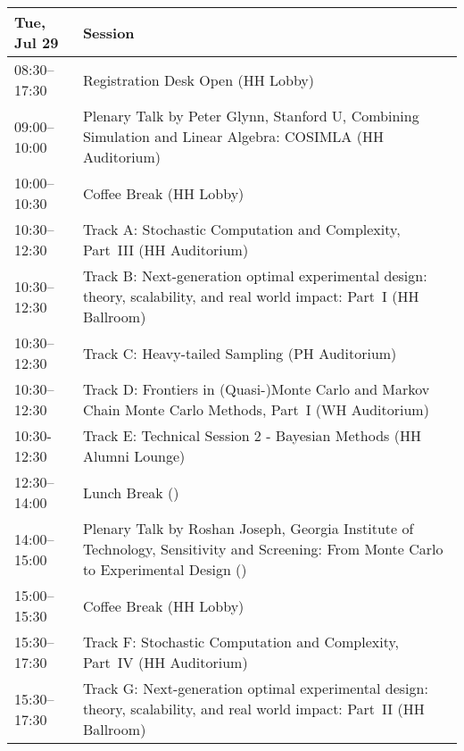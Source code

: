 \begin{table}
{\footnotesize
\begin{tabularx}{\textwidth}{>{\hsize=0.32\hsize}X|>{\hsize=1.7\hsize}X}
\hline
\textbf{Tue, Jul 29} & \textbf{Session} \\
\hline
\cellcolor{\EmptyColor}08:30–17:30 & \cellcolor{\EmptyColor}Registration Desk Open (HH Lobby) \\
\cellcolor{\PlenaryColor}09:00–10:00 & \cellcolor{\PlenaryColor}Plenary Talk by Peter Glynn, Stanford U, Combining Simulation and Linear Algebra: COSIMLA (HH Auditorium) \\
\cellcolor{\EmptyColor}10:00–10:30 & \cellcolor{\EmptyColor}Coffee Break (HH Lobby) \\
\cellcolor{\SessionTitleColor}10:30–12:30 & \cellcolor{\SessionTitleColor}Track A: Stochastic Computation and Complexity, Part~III (HH Auditorium) \\
\cellcolor{\SessionTitleColor}10:30–12:30 & \cellcolor{\SessionTitleColor}Track B: Next-generation optimal experimental design: theory, scalability, and real world impact: Part~I (HH Ballroom) \\
\cellcolor{\SessionTitleColor}10:30–12:30 & \cellcolor{\SessionTitleColor}Track C: Heavy-tailed Sampling (PH Auditorium) \\
\cellcolor{\SessionTitleColor}10:30–12:30 & \cellcolor{\SessionTitleColor}Track D: Frontiers in (Quasi-)Monte Carlo and Markov Chain Monte Carlo Methods, Part~I (WH Auditorium) \\
\cellcolor{\SessionLightColor}10:30-12:30 & \cellcolor{\SessionLightColor}Track E: Technical Session 2 - Bayesian Methods (HH Alumni Lounge) \\
\cellcolor{\EmptyColor}12:30–14:00 & \cellcolor{\EmptyColor}Lunch Break () \\
\cellcolor{\PlenaryColor}14:00–15:00 & \cellcolor{\PlenaryColor}Plenary Talk by Roshan Joseph, Georgia Institute of Technology, Sensitivity and Screening: From Monte Carlo to Experimental Design () \\
\cellcolor{\EmptyColor}15:00–15:30 & \cellcolor{\EmptyColor}Coffee Break (HH Lobby) \\
\cellcolor{\SessionTitleColor}15:30–17:30 & \cellcolor{\SessionTitleColor}Track F: Stochastic Computation and Complexity, Part~IV (HH Auditorium) \\
\cellcolor{\SessionTitleColor}15:30–17:30 & \cellcolor{\SessionTitleColor}Track G: Next-generation optimal experimental design: theory, scalability, and real world impact: Part~II (HH Ballroom) \\

\end{tabularx}}
\end{table}
